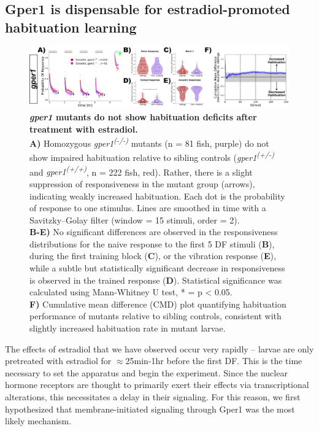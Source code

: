 \documentclass[10pt,lineno]{RandlettLab_elife}
\begin{document}
{\subsection{Gper1 is dispensable for estradiol-promoted habituation learning}

\begin{figure}
\begin{fullwidth}
\begin{center}
\includegraphics[width=0.8\linewidth]{figures/gper1Mutants.png}
\caption{\textbf{\emph{gper1} mutants do not show habituation deficits after treatment with estradiol.} \scriptsize
\\ \textbf{A)} Homozygous \emph{gper1\textsuperscript{(-/-)}} mutants (n = 81 fish, purple) do not show impaired habituation relative to sibling controls (\emph{gper1\textsuperscript{(+/-)}} and \emph{gper1\textsuperscript{(+/+)}}, n = 222 fish, red). Rather, there is a slight suppression of responsiveness in the mutant group (arrows), indicating weakly increased habituation. Each dot is the probability of response to one stimulus. Lines are smoothed in time with a Savitzky–Golay filter (window = 15 stimuli, order = 2).
\\ \textbf{B-E)} No significant differences are observed in the responsiveness distributions for the naive response to the first 5 DF stimuli (\textbf{B}), during the first training block (\textbf{C}), or the vibration response (\textbf{E}), while a subtle but statistically significant decrease in responsiveness is observed in the trained response (\textbf{D}). Statistical significance was calculated using Mann-Whitney U test, * = p < 0.05.
\\ \textbf{F)} Cumulative mean difference (CMD) plot quantifying habituation performance of mutants relative to sibling controls, consistent with slightly increased habituation rate in mutant larvae. 
}
\label{fig:2}

\end{center}
\end{fullwidth}
\end{figure}

The effects of estradiol that we have observed occur very rapidly -- larvae are only pretreated with estradiol for $\approx$25min-1hr before the first DF. 
This is the time necessary to set the apparatus and begin the experiment.
Since the nuclear hormone receptors are thought to primarily exert their effects via transcriptional alterations, this necessitates a delay in their signaling.
For this reason, we first hypothesized that membrane-initiated signaling through Gper1 was the most likely mechanism. 

}
\end{document}
